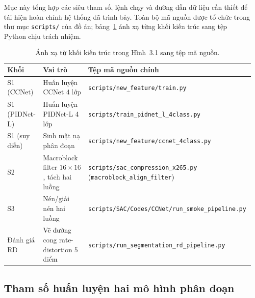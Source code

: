 Mục này tổng hợp các siêu tham số, lệnh chạy và đường dẫn dữ liệu cần thiết để tái hiện hoàn chỉnh hệ thống đã trình bày. Toàn bộ mã nguồn được tổ chức trong thư mục \texttt{scripts/} của đồ án; bảng~\ref{tab:script-map} ánh xạ từng khối kiến trúc sang tệp Python chịu trách nhiệm.

\begin{table}[H]
\centering
\caption{Ánh xạ từ khối kiến trúc trong Hình~3.1 sang tệp mã nguồn.}
\label{tab:script-map}
\small
\begin{tabular}{l|l|l}
\hline
\textbf{Khối} & \textbf{Vai trò} & \textbf{Tệp mã nguồn chính} \\
\hline
S1 (CCNet) & Huấn luyện CCNet 4 lớp & \texttt{scripts/new\_feature/train.py} \\
S1 (PIDNet-L) & Huấn luyện PIDNet-L 4 lớp & \texttt{scripts/train\_pidnet\_l\_4class.py} \\
S1 (suy diễn) & Sinh mặt nạ phân đoạn & \texttt{scripts/new\_feature/ccnet\_4class.py} \\
S2 & Macroblock filter $16\times16$, tách hai luồng & \texttt{scripts/sac\_compression\_x265.py} (\texttt{macroblock\_align\_filter}) \\
S3 & Nén/giải nén hai luồng & \texttt{scripts/SAC/Codes/CCNet/run\_smoke\_pipeline.py} \\
Đánh giá RD & Vẽ đường cong rate-distortion 5 điểm & \texttt{scripts/run\_segmentation\_rd\_pipeline.py} \\
\hline
\end{tabular}
\end{table}

\subsection{Tham số huấn luyện hai mô hình phân đoạn}

